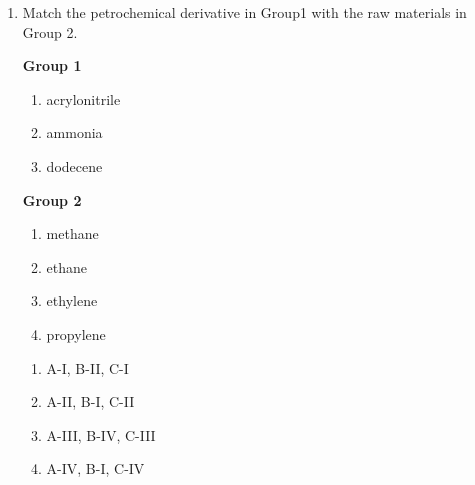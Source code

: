 \documentclass[journal,12pt,onecolumn]{IEEEtran}
\theoremstyle{remark}
\begin{document}
\begin{enumerate}
\begin{multicols}{2}
\columnbreak

\textbf{Group 2}
\begin{enumerate}[label =\Roman*]
    \item polyamide
    \item polyester
    \item cellulose
    \item acrylic
\end{enumerate}
\end{multicols}

\begin{multicols}{4}
\begin{enumerate}
    \item A-II, B-III, C-I
    \item A-III, B-IV, C-II
    \item A-III, B-I, C-III
    \item A-III, B-III, C-IV
\end{enumerate}
\end{multicols}

 \item Match the petrochemical derivative in Group1 with the raw materials in Group 2.

\begin{multicols}{2}
\textbf{Group 1}
\begin{enumerate}[label =\Alph*]
    \item acrylonitrile
    \item ammonia
    \item dodecene
\end{enumerate}

\columnbreak

\textbf{Group 2}
\begin{enumerate}[label =\Roman*]
    \item methane
    \item ethane
    \item ethylene
    \item propylene
\end{enumerate}
\end{multicols}

\begin{multicols}{4}
\begin{enumerate}
    \item A-I, B-II, C-I
    \item A-II, B-I, C-II
    \item A-III, B-IV, C-III
    \item A-IV, B-I, C-IV
\end{enumerate}
\end{multicols}


\end{enumerate}
\end{document}
